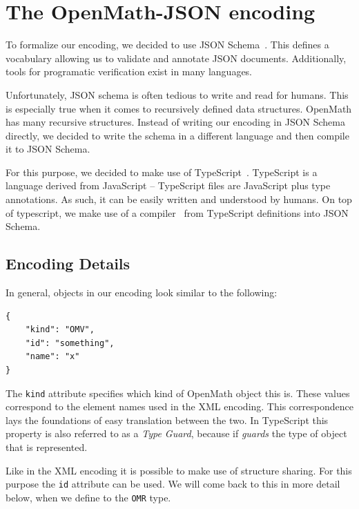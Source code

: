 \section{The OpenMath-JSON encoding}\label{sec:encoding}

To formalize our encoding, we decided to use JSON Schema~\cite{handrewsjsonschema:18}. 
This defines a vocabulary allowing us to validate and annotate JSON documents. 
Additionally, tools for programatic verification exist in many languages. 

Unfortunately, JSON schema is often tedious to write and read for humans. 
This is especially true when it comes to recursively defined data structures.
OpenMath has many recursive structures.
Instead of writing our encoding in JSON Schema directly, we decided to write the schema in a different language and then compile it to JSON Schema. 

For this purpose, we decided to make use of TypeScript~\cite{typescript:webpage}. 
TypeScript is a language derived from JavaScript -- TypeScript files are JavaScript plus type annotations. 
As such, it can be easily written and understood by humans. 
On top of typescript, we make use of a compiler~\cite{vega-ts-jscon-schema-generator:webpage} from TypeScript definitions into JSON Schema. 

\subsection{Encoding Details}

In general, objects in our encoding look similar to the following:
\\\begin{minipage}{\linewidth}\begin{lstlisting}
{
    "kind": "OMV",
    "id": "something",
    "name": "x"
}
\end{lstlisting}\end{minipage}

The \texttt{kind} attribute specifies which kind of OpenMath object this is. 
These values correspond to the element names used in the XML encoding. 
This correspondence lays the foundations of easy translation between the two. 
In TypeScript this property is also referred to as a \textit{Type Guard}, because if \textit{guards} the type of object that is represented. 

Like in the XML encoding it is possible to make use of structure sharing. 
For this purpose the \texttt{id} attribute can be used. 
We will come back to this in more detail below, when we define to the \texttt{OMR} type.

